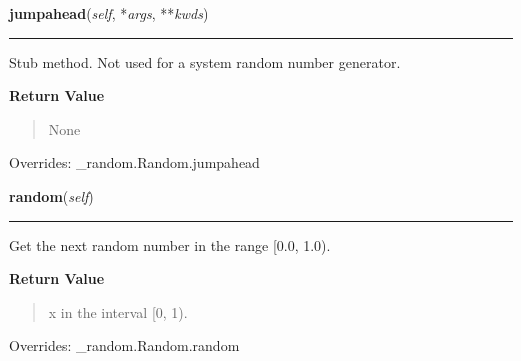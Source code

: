     \vspace{0.5ex}

\hspace{.8\funcindent}\begin{boxedminipage}{\funcwidth}

    \raggedright \textbf{jumpahead}(\textit{self}, *\textit{args}, **\textit{kwds})

    \vspace{-1.5ex}

    \rule{\textwidth}{0.5\fboxrule}
\setlength{\parskip}{2ex}
    Stub method.  Not used for a system random number generator.

\setlength{\parskip}{1ex}
      \textbf{Return Value}
    \vspace{-1ex}

      \begin{quote}
      None

      \end{quote}

      Overrides: \_random.Random.jumpahead

    \end{boxedminipage}

    \vspace{0.5ex}

\hspace{.8\funcindent}\begin{boxedminipage}{\funcwidth}

    \raggedright \textbf{random}(\textit{self})

    \vspace{-1.5ex}

    \rule{\textwidth}{0.5\fboxrule}
\setlength{\parskip}{2ex}
    Get the next random number in the range [0.0, 1.0).

\setlength{\parskip}{1ex}
      \textbf{Return Value}
    \vspace{-1ex}

      \begin{quote}
      x in the interval [0, 1).

      \end{quote}

      Overrides: \_random.Random.random

    \end{boxedminipage}

    \vspace{0.5ex}


